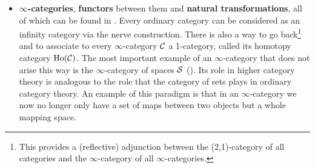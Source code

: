 \begin{itemize}
    \item \textbf{$\infty$-categories}, \textbf{functors} between them and \textbf{natural transformations}, all of which can be found in \cite[Chapter~1]{HigherToposTheory}. Every ordinary category can be considered as an infinity category via the nerve construction. There is also a way to go back\footnote{This provides a (reflective) adjunction between the (2,1)-category of all categories and the $\infty$-category of all $\infty$-categories.} and to associate to every $\infty$-category $\mathcal{C}$ a 1-category, called its homotopy category $\operatorname{Ho}(\mathcal{C})$.
    The most important example of an $\infty$-category that does not arise this way is the $\infty$-category of spaces $\mathcal{S}$ (\cite[Section~1.2.16]{HigherToposTheory}). Its role in higher category theory is analogous to the role that the category of sets plays in ordinary category theory. An example of this paradigm is that in an $\infty$-category we now no longer only have a set of maps between two objects but a whole mapping space. 
    

\end{itemize}
